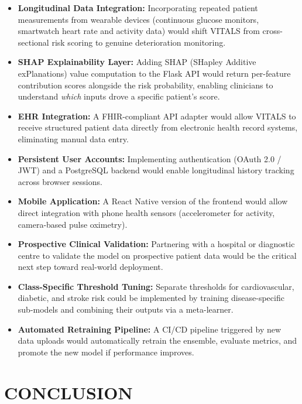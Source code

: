 \documentclass[12pt,a4paper]{report}
\begin{document}
\begin{itemize}[leftmargin=*]
  \item \textbf{Longitudinal Data Integration:} Incorporating repeated patient measurements from wearable devices (continuous glucose monitors, smartwatch heart rate and activity data) would shift VITALS from cross-sectional risk scoring to genuine deterioration monitoring.
  \item \textbf{SHAP Explainability Layer:} Adding SHAP (SHapley Additive exPlanations) value computation to the Flask API would return per-feature contribution scores alongside the risk probability, enabling clinicians to understand \textit{which} inputs drove a specific patient's score.
  \item \textbf{EHR Integration:} A FHIR-compliant API adapter would allow VITALS to receive structured patient data directly from electronic health record systems, eliminating manual data entry.
  \item \textbf{Persistent User Accounts:} Implementing authentication (OAuth 2.0 / JWT) and a PostgreSQL backend would enable longitudinal history tracking across browser sessions.
  \item \textbf{Mobile Application:} A React Native version of the frontend would allow direct integration with phone health sensors (accelerometer for activity, camera-based pulse oximetry).
  \item \textbf{Prospective Clinical Validation:} Partnering with a hospital or diagnostic centre to validate the model on prospective patient data would be the critical next step toward real-world deployment.
  \item \textbf{Class-Specific Threshold Tuning:} Separate thresholds for cardiovascular, diabetic, and stroke risk could be implemented by training disease-specific sub-models and combining their outputs via a meta-learner.
  \item \textbf{Automated Retraining Pipeline:} A CI/CD pipeline triggered by new data uploads would automatically retrain the ensemble, evaluate metrics, and promote the new model if performance improves.
\end{itemize}

\chapter{CONCLUSION}
\end{document}

